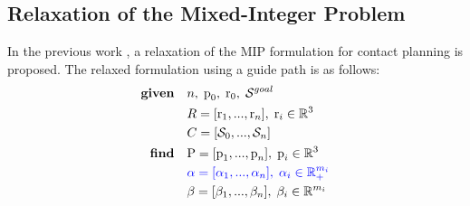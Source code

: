 \subsection{Relaxation of the Mixed-Integer Problem}
In the previous work \cite{sl1m_v1}, a relaxation of the MIP formulation for contact planning is proposed.
The relaxed formulation using a guide path is as follows:
\begin{align}
    \textrm{\textbf{given}} %
                            \quad & n, \;\mbox{p}_0, \; \mbox{r}_0, \; \mathcal{S}^{goal} \nonumber\\
                            \quad & R=[\mbox{r}_1,...,\mbox{r}_n], \; \mbox{r}_i \in \mathbb{R}^{3} \nonumber\\
                            \quad & C=[\mathcal{S}_0, ..., \mathcal{S}_n] \nonumber\\
    \textrm{\textbf{find}}  \quad & \mbox{P}=[\mbox{p}_1,...,\mbox{p}_n], \;\mbox{p}_i \in \mathbb{R}^{3} \nonumber\\
                            \quad & \textcolor{blue}{\alpha=[\alpha_1,...,\alpha_n], \; \alpha_i \in \mathbb{R}_{+}^{m_i}} \label{eq:mbc:sl1m:slack_relaxed}\\
                            \quad & \beta=[\beta_1,...,\beta_n], \; \beta_i \in \mathbb{R}^{m_i} \nonumber\\

\end{align}
